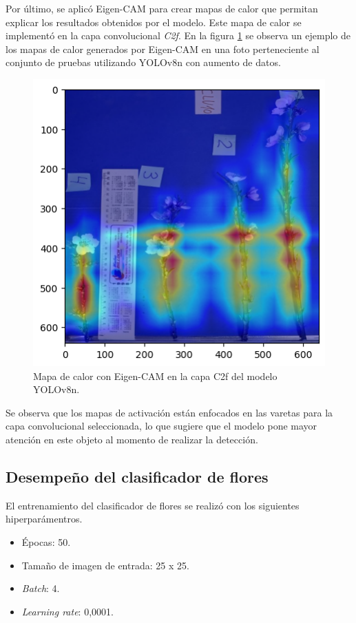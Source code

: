 Por último, se aplicó Eigen-CAM \cite{ARTICLE:17} para crear mapas de calor que permitan explicar los resultados obtenidos por el modelo. Este mapa de calor se implementó en la capa convolucional \textit{C2f}. En la figura \ref{fig:EigenCam} se observa un ejemplo de los mapas de calor generados por Eigen-CAM en una foto perteneciente al conjunto de pruebas utilizando YOLOv8n con aumento de datos.

\begin{figure}[ht]
	\centering
	\includegraphics[scale=0.55]{./Figures/EigenCamEj.png}
	\caption{Mapa de calor con Eigen-CAM en la capa C2f del modelo YOLOv8n.}
	\label{fig:EigenCam}
\end{figure}

Se observa que los mapas de activación están enfocados en las varetas para la capa convolucional seleccionada, lo que sugiere que el modelo pone mayor atención en este objeto al momento de realizar la detección. 

\subsection{Desempeño del clasificador de flores}

El entrenamiento del clasificador de flores se realizó con los siguientes hiperparámentros.

\begin{itemize}
	\item Épocas: 50.
    \item Tamaño de imagen de entrada: 25 x 25.
    \item \textit{Batch}: 4.
    \item \textit{Learning rate}: 0,0001.
\end{itemize}


